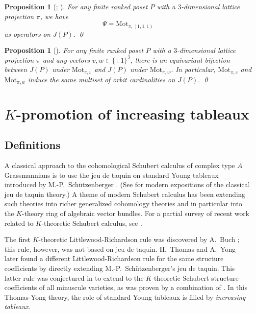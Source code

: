\documentclass[12pt]{amsart}
\newtheorem{proposition}[theorem]{Proposition}
\theoremstyle{definition}
\theoremstyle{remark}
\numberwithin{equation}{section}
\newcommand{\mot}{\ensuremath{\mathrm{Mot}}}
\begin{document}
\begin{proposition}[{\cite[Lemma~1]{Cameron.Fonderflaass}}; {\cite[Proposition~3.18]{DPS}}]
\label{prop:psi_is_toggle}
For any finite ranked poset $P$ with a $3$-dimensional lattice projection $\pi$, we have 
\[
 \Psi  = \mot_{\pi, (1,1,1)}  \] 
 as operators on $J(P)$. \qed
\end{proposition}

\begin{proposition}[{\cite[Theorem~3.25]{DPS}}]
\label{prop:conjugate_actions}
For any finite ranked poset $P$ with a $3$-dimensional lattice projection $\pi$ and any vectors $v,w \in \{ \pm 1 \}^3$, there is an equivariant bijection between $J(P)$ under $\mot_{\pi, v}$ and $J(P)$ under $\mot_{\pi,w}$. In particular, $\mot_{\pi, v}$ and $\mot_{\pi,w}$ induce the same multiset of orbit cardinalities on $J(P)$. \qed
\end{proposition}

\section{$K$-promotion of increasing tableaux}\label{sec:Kpromotion}

\subsection{Definitions}\label{sec:Kpro_defs}
A classical approach to the cohomological Schubert calculus of complex type $A$ Grassmannians is to use the jeu de taquin on standard Young tableaux introduced by M.-P.~Sch\"utzenberger \cite{Schutzenberger:jdt}. (See \cite{Fulton, Manivel} for modern expositions of the classical jeu de taquin theory.) A theme of modern Schubert calculus has been extending such theories into richer generalized cohomology theories and in particular into the $K$-theory ring of algebraic vector bundles. For a partial survey of recent work related to $K$-theoretic Schubert calculus, see \cite{Pechenik.Yong:genomic}.

The first $K$-theoretic Littlewood-Richardson rule was discovered by A.~Buch \cite{Buch}; this rule, however, was not based on jeu de taquin. H.~Thomas and A.~Yong \cite{Thomas.Yong:K} later found a different Littlewood-Richardson rule for the same structure coefficients by directly extending M.-P.~Sch\"utzenberger's jeu de taquin. This latter rule was conjectured in \cite{Thomas.Yong:K} to extend to the $K$-theoretic Schubert structure coefficients of all minuscule varieties, as was proven by a combination of \cite{Buch.Ravikumar,Clifford.Thomas.Yong,Buch.Samuel}. In this Thomas-Yong theory, the role of standard Young tableaux is filled by \emph{increasing tableaux}.
\end{document}
